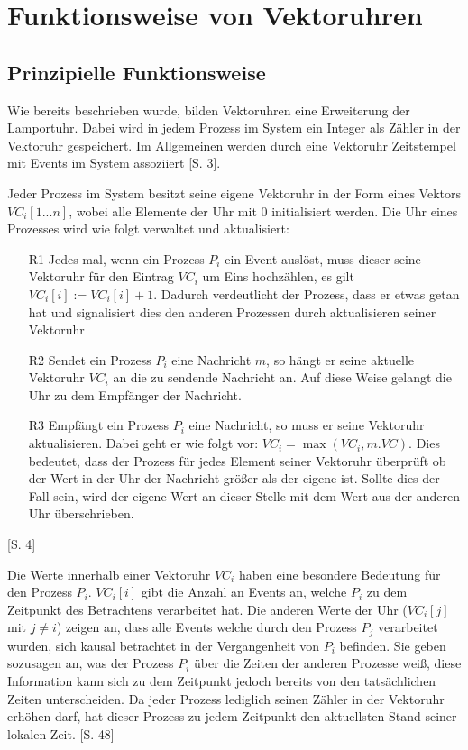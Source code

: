 \section{Funktionsweise von Vektoruhren}
\subsection{Prinzipielle Funktionsweise}

Wie bereits beschrieben wurde, bilden Vektoruhren eine Erweiterung der Lamportuhr. Dabei wird in jedem Prozess im System ein Integer als Zähler in der Vektoruhr gespeichert. Im Allgemeinen werden durch eine Vektoruhr Zeitstempel mit Events im System assoziiert \cite{Baldoni:2002:FDC:1435723.1437765}[S. 3].

Jeder Prozess im System besitzt seine eigene Vektoruhr in der Form eines Vektors $VC_i[1...n]$, wobei alle Elemente der Uhr mit $0$ initialisiert werden. Die Uhr eines Prozesses wird wie folgt verwaltet und aktualisiert:

\begin{itemize}
	\item[R1]Jedes mal, wenn ein Prozess $P_i$ ein Event auslöst, muss dieser seine Vektoruhr für den Eintrag $VC_i$ um Eins hochzählen, es gilt  $VC_i[i] := VC_i[i] + 1$. Dadurch verdeutlicht der Prozess, dass er etwas getan hat und signalisiert dies den anderen Prozessen durch aktualisieren seiner Vektoruhr 
	\item[R2]Sendet ein Prozess $P_i$ eine Nachricht $m$, so hängt er seine aktuelle Vektoruhr $VC_i$ an die zu sendende Nachricht an. Auf diese Weise gelangt die Uhr zu dem Empfänger der Nachricht.
	\item[R3]Empfängt ein Prozess $P_i$ eine Nachricht, so muss er seine Vektoruhr aktualisieren. Dabei geht er wie folgt vor: $VC_i = \max(VC_i, m.VC)$. Dies bedeutet, dass der Prozess für jedes Element seiner Vektoruhr überprüft ob der Wert in der Uhr der Nachricht größer als der eigene ist. Sollte dies der Fall sein, wird der eigene Wert an dieser Stelle mit dem Wert aus der anderen Uhr überschrieben.\label{R3}
\end{itemize} \cite{Baldoni:2002:FDC:1435723.1437765}[S. 4]

Die Werte innerhalb einer Vektoruhr $VC_i$ haben eine besondere Bedeutung für den Prozess $P_i$. $VC_i[i]$ gibt die Anzahl an Events an, welche $P_i$ zu dem Zeitpunkt des Betrachtens verarbeitet hat. Die anderen Werte der Uhr ($VC_i[j]$ mit $j \neq i$) zeigen an, dass alle Events welche durch den Prozess $P_j$ verarbeitet wurden, sich kausal betrachtet in der Vergangenheit von $P_i$ befinden. Sie geben sozusagen an, was der Prozess $P_i$ über die Zeiten der anderen Prozesse weiß, diese Information kann sich zu dem Zeitpunkt jedoch bereits von den tatsächlichen Zeiten unterscheiden. Da jeder Prozess lediglich seinen Zähler in der Vektoruhr erhöhen darf, hat dieser Prozess zu jedem Zeitpunkt den aktuellsten Stand seiner lokalen Zeit. \cite{SINGHAL199247}[S. 48]

